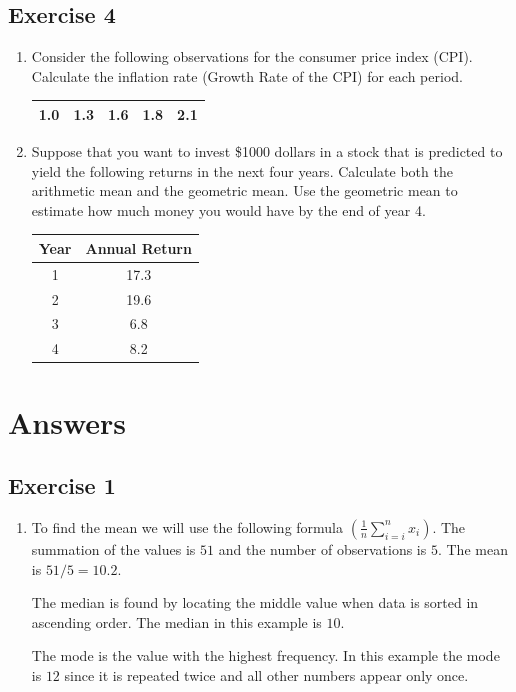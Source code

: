 \documentclass[
  letterpaper,
  DIV=11,
  numbers=noendperiod]{scrreprt}
\begin{document}
\hypertarget{exercise-4}{%
\subsection*{Exercise 4}\label{exercise-4}}

\begin{enumerate}
\def\labelenumi{\arabic{enumi}.}
\item
  Consider the following observations for the consumer price index
  (CPI). Calculate the inflation rate (Growth Rate of the CPI) for each
  period.

  \begin{longtable}[]{@{}ccccc@{}}
  \toprule()
  \endhead
  1.0 & 1.3 & 1.6 & 1.8 & 2.1 \\
  \bottomrule()
  \end{longtable}
\item
  Suppose that you want to invest \$1000 dollars in a stock that is
  predicted to yield the following returns in the next four years.
  Calculate both the arithmetic mean and the geometric mean. Use the
  geometric mean to estimate how much money you would have by the end of
  year 4.

  \begin{longtable}[]{@{}cc@{}}
  \toprule()
  Year & Annual Return \\
  \midrule()
  \endhead
  1 & 17.3 \\
  2 & 19.6 \\
  3 & 6.8 \\
  4 & 8.2 \\
  \bottomrule()
  \end{longtable}
\end{enumerate}

\hypertarget{answers-2}{%
\section{Answers}\label{answers-2}}

\hypertarget{exercise-1-5}{%
\subsection*{Exercise 1}\label{exercise-1-5}}

\begin{enumerate}
\def\labelenumi{\arabic{enumi}.}
\item
  To find the mean we will use the following formula
  \(( \frac{1}{n} \sum_{i=i}^{n} x_{i})\). The summation of the values
  is \(51\) and the number of observations is \(5\). The mean is
  \(51/5=10.2\).

  The median is found by locating the middle value when data is sorted
  in ascending order. The median in this example is \(10\).

  The mode is the value with the highest frequency. In this example the
  mode is \(12\) since it is repeated twice and all other numbers appear
  only once.
\end{enumerate}
\end{document}
